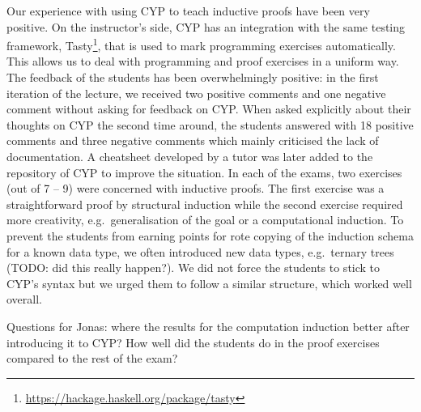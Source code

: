 Our experience with using CYP to teach inductive proofs have been very positive.
On the instructor's side, CYP has an integration with the same testing framework, Tasty\footnote{\url{https://hackage.haskell.org/package/tasty}}, that is used to mark programming exercises automatically.
This allows us to deal with programming and proof exercises in a uniform way.
The feedback of the students has been overwhelmingly positive:
in the first iteration of the lecture, we received two positive comments and one negative comment without asking for feedback on CYP.
When asked explicitly about their thoughts on CYP the second time around, the students answered with 18 positive comments and three negative comments which mainly criticised the lack of documentation.
A cheatsheet developed by a tutor was later added to the repository of CYP to improve the situation.
In each of the exams, two exercises (out of 7 -- 9) were concerned with inductive proofs.
The first exercise was a straightforward proof by structural induction while the second exercise required more creativity, e.g.\ generalisation of the goal or a computational induction.
To prevent the students from earning points for rote copying of the induction schema for a known data type, we often introduced new data types, e.g.\ ternary trees (TODO: did this really happen?).
We did not force the students to stick to CYP's syntax but we urged them to follow a similar structure, which worked well overall.

Questions for Jonas: where the results for the computation induction better after introducing it to CYP? How well did the students do in the proof exercises compared to the rest of the exam?


